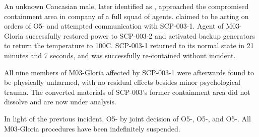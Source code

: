 An unknown Caucasian male, later identified as \redacted, approached the compromised containment area in company of a full squad of agents. \redacted claimed to be acting on orders of O5- and attempted communication with SCP-003-1. \expunged Agent  of M03-Gloria successfully restored power to SCP-003-2 and activated backup generators to return the temperature to 100\degree C. SCP-003-1 returned to its normal state in 21 minutes and 7 seconds, and was successfully re-contained without incident.

All nine members of M03-Gloria affected by SCP-003-1 were afterwards found to be physically unharmed, with no residual effects besides minor psychological trauma. The converted materials of SCP-003's former containment area did not dissolve and are now under analysis.

 In light of the previous incident, O5- \expunged by joint decision of O5-, O5-, and O5-. All M03-Gloria procedures have been indefinitely suspended.
